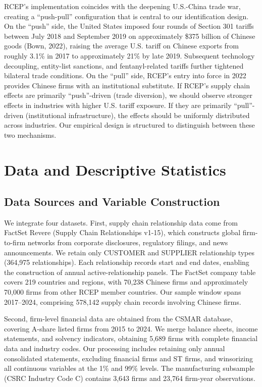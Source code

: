 \documentclass[preprint,12pt,authoryear]{elsarticle}
\begin{document}
RCEP's implementation coincides with the deepening U.S.-China trade war, creating a ``push-pull'' configuration that is central to our identification design. On the ``push'' side, the United States imposed four rounds of Section 301 tariffs between July 2018 and September 2019 on approximately \$375 billion of Chinese goods (Bown, 2022), raising the average U.S. tariff on Chinese exports from roughly 3.1\% in 2017 to approximately 21\% by late 2019. Subsequent technology decoupling, entity-list sanctions, and fentanyl-related tariffs further tightened bilateral trade conditions. On the ``pull'' side, RCEP's entry into force in 2022 provides Chinese firms with an institutional substitute. If RCEP's supply chain effects are primarily ``push''-driven (trade diversion), we should observe stronger effects in industries with higher U.S. tariff exposure. If they are primarily ``pull''-driven (institutional infrastructure), the effects should be uniformly distributed across industries. Our empirical design is structured to distinguish between these two mechanisms.

\section{Data and Descriptive Statistics}
\label{sec:data}

\subsection{Data Sources and Variable Construction}

We integrate four datasets. First, supply chain relationship data come from FactSet Revere (Supply Chain Relationships v1-15), which constructs global firm-to-firm networks from corporate disclosures, regulatory filings, and news announcements. We retain only CUSTOMER and SUPPLIER relationship types (364,975 relationships). Each relationship records start and end dates, enabling the construction of annual active-relationship panels. The FactSet company table covers 219 countries and regions, with 70,238 Chinese firms and approximately 70,000 firms from other RCEP member countries. Our sample window spans 2017--2024, comprising 578,142 supply chain records involving Chinese firms.

Second, firm-level financial data are obtained from the CSMAR database, covering A-share listed firms from 2015 to 2024. We merge balance sheets, income statements, and solvency indicators, obtaining 5,689 firms with complete financial data and industry codes. Our processing includes retaining only annual consolidated statements, excluding financial firms and ST firms, and winsorizing all continuous variables at the 1\% and 99\% levels. The manufacturing subsample (CSRC Industry Code C) contains 3,643 firms and 23,764 firm-year observations.
\end{document}
